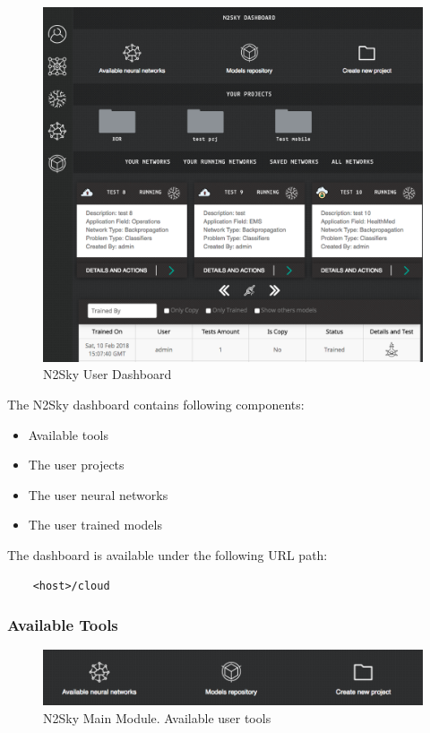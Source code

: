 \begin{figure}[H]
\begin{center}
  \includegraphics[width=\linewidth]{components/5/img/n2sky_main_dashboard.png}
  \caption{N2Sky User Dashboard}
  \label{fig:n2skymaindashboard}
\end{center}
\end{figure}

The N2Sky dashboard contains following components:
\begin{itemize}
\item Available tools
\item The user projects
\item The user neural networks 
\item The user trained models
\end{itemize}

The dashboard is available under the following URL path:
 \begin{lstlisting}
    <host>/cloud
\end{lstlisting}

\subsubsection{Available Tools}

\begin{figure}[htbp]
\begin{center}
  \includegraphics[scale=0.5]{components/5/img/n2sky_tools.png}
  \caption{N2Sky Main Module. Available user tools}
  \label{fig:n2sky_tools}
\end{center}
\end{figure}


